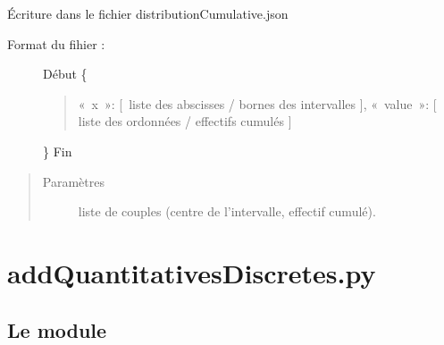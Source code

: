 \documentclass[letterpaper,10pt,french]{sphinxmanual}
\begin{document}

\begin{fulllineitems}
\label{\detokenize{addQuantitativesContinues:add.addQuantitativesContinues.infoDistributionCumulativeContinue}}
Écriture dans le fichier distributionCumulative.json
\begin{description}
\item[{Format du fihier :}] \leavevmode
Début
\{
\begin{quote}

« x »: {[} liste des abscisses / bornes des intervalles {]},
« value »: {[} liste des ordonnées / effectifs cumulés {]}
\end{quote}

\}
Fin

\end{description}
\begin{quote}\begin{description}
\item[{Paramètres}] \leavevmode
{} \textendash{} liste de couples (centre de l’intervalle, effectif cumulé).

\end{description}\end{quote}

\end{fulllineitems}



\chapter{addQuantitativesDiscretes.py}
\label{\detokenize{addQuantitativesDiscretes:addquantitativesdiscretes-py}}\label{\detokenize{addQuantitativesDiscretes:module-add.addQuantitativesDiscretes}}\label{\detokenize{addQuantitativesDiscretes::doc}}

\section{Le module }
\label{\detokenize{addQuantitativesDiscretes:le-module-analyse-de-donnees-quantitatives-discretes}}
\end{document}
